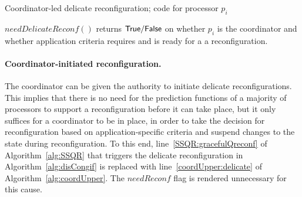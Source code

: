 \documentclass[11pt]{article}
\begin{document}
\begingroup
\LinesNumberedHidden
\begin{algorithm}[t!]

\caption{Coordinator-led delicate reconfiguration; code for processor $p_i$}
\label{alg:coordUpper}

\begin{footnotesize}

 
$needDelicateReconf()$ returns $\sf True/False$ on whether $p_i$ is the coordinator and whether application criteria requires and is ready for a  a reconfiguration.
\label{coordUpper:interfaces}

\vspace{.3em}

 


\end{footnotesize}
\end{algorithm}
\endgroup





\paragraph{Coordinator-initiated reconfiguration.}
The coordinator can be given the authority to initiate delicate reconfigurations.
This implies that there is no need for the prediction functions of a majority of processors to support a reconfiguration before it can take place, but it only suffices for a coordinator to be in place, in order to take the decision for reconfiguration based on application-specific criteria and suspend changes to the state during reconfiguration. To this end, line~\ref{SSQR:gracefulQreconf} of Algorithm~\ref{alg:SSQR} that triggers the delicate reconfiguration in Algorithm~\ref{alg:disCongif} is replaced with line~\ref{coordUpper:delicate} of Algorithm~\ref{alg:coordUpper}.
The $needReconf$ flag is rendered unnecessary for this cause.
\end{document}
